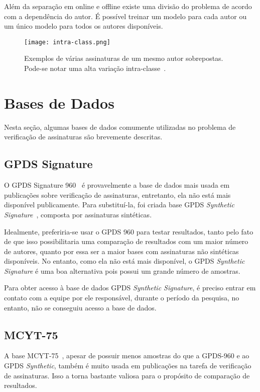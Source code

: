 \documentclass[11pt, twocolumn, a4paper]{article}
\begin{document}
Além da separação em online e offline existe uma divisão do problema de acordo com a dependência do autor. É possível treinar um modelo para cada autor ou um único modelo para todos os autores disponíveis.

\begin{figure}[!htb]
\centering
\texttt{[image: intra-class.png]}
\caption{Exemplos de várias assinaturas de um mesmo autor sobrepostas. Pode-se notar uma alta variação intra-classe~\cite{intra_class}.}
\label{intra_class_image}
\end{figure}

\section{Bases de Dados}

Nesta seção, algumas bases de dados comumente utilizadas no problema de verificação de assinaturas são brevemente descritas.

\subsection{GPDS Signature}

O GPDS Signature 960~\cite{gpds} é provavelmente a base de dados mais usada em publicações sobre verificação de assinaturas, entretanto, ela não está mais disponível publicamente. Para substituí-la, foi criada base GPDS {\it Synthetic Signature}~\cite{gpds synthetic}, composta por assinaturas sintéticas.

Idealmente, preferiria-se usar o GPDS 960 para testar resultados, tanto pelo fato de que isso possibilitaria uma comparação de resultados com um maior número de autores, quanto por essa ser a maior bases com assinaturas não sintéticas disponíveis. No entanto, como ela não está mais disponível, o GPDS {\it Synthetic Signature} é uma boa alternativa pois possui um grande número de amostras.

Para obter acesso à base de dados GPDS {\it Synthetic Signature}, é preciso entrar em contato com a equipe por ele responsável, durante o período da pesquisa, no entanto, não se conseguiu acesso a base de dados.

\subsection{MCYT-75}

A base MCYT-75~\cite{mcyt}, apesar de possuir menos amostras do que a GPDS-960 e ao GPDS {\it Synthetic}, também é muito usada em publicações na tarefa de verificação de assinaturas. Isso a torna bastante valiosa para o propósito de comparação de resultados.
\end{document}
